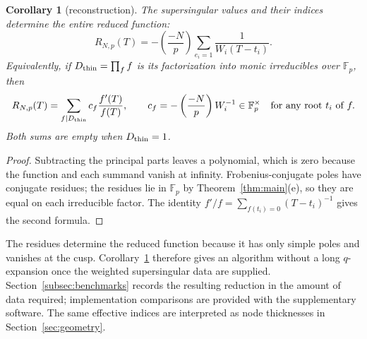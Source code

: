 \documentclass[11pt,a4paper]{article}
\numberwithin{equation}{section}
\newtheorem{corollary}[theorem]{Corollary}
\theoremstyle{definition}
\theoremstyle{remark}
\newcommand{\Fp}{\mathbb F_p}
\newcommand{\Lp}[1]{\left(\frac{#1}{p}\right)}
\begin{document}
\begin{corollary}[reconstruction]\label{cor:reconstruction}
The supersingular values and their indices determine the entire reduced function:
\begin{equation}\label{eq:partial-fractions}
R_{N,p}(T)=-\Lp{-N}\sum_{e_i=1}\frac{1}{W_i(T-t_i)}.
\end{equation}
Equivalently, if $D_{\rm thin}=\prod_f f$ is its factorization into monic
irreducibles over $\Fp$, then
\begin{equation}\label{eq:factor-reconstruction}
R_{N,p}(T)=\sum_{f\mid D_{\rm thin}} c_f\frac{f'(T)}{f(T)},\qquad
c_f=-\Lp{-N}W_i^{-1}\in\Fp^\times\quad\text{for any root }t_i\text{ of }f.
\end{equation}
Both sums are empty when $D_{\rm thin}=1$.
\end{corollary}
\begin{proof}
Subtracting the principal parts leaves a polynomial, which is zero because the
function and each summand vanish at infinity. Frobenius-conjugate poles have
conjugate residues; the residues lie in $\Fp$ by Theorem~\ref{thm:main}(e), so
they are equal on each irreducible factor. The identity
$f'/f=\sum_{f(t_i)=0}(T-t_i)^{-1}$ gives the second formula.
\end{proof}


The residues determine the reduced function because it has only simple
poles and vanishes at the cusp. Corollary~\ref{cor:reconstruction}
therefore gives an algorithm without a long $q$-expansion once the
weighted supersingular data are supplied. Section~\ref{subsec:benchmarks}
records the resulting reduction in the amount of data required;
implementation comparisons are provided with the supplementary software.
The same effective indices are interpreted as node thicknesses in
Section~\ref{sec:geometry}.
\end{document}
